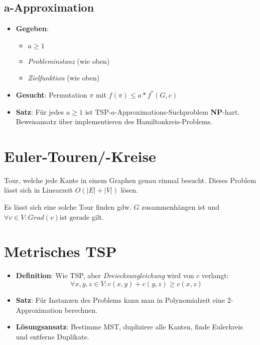\subsection{a-Approximation}

\begin{itemize}
  \item \textbf{Gegeben}:
  \begin{itemize}
    \item $ a \geq 1 $
    \item \emph{Probleminstanz} (wie oben)
    \item \emph{Zielfunktion} (wie oben)
  \end{itemize}
  \item \textbf{Gesucht}: Permutation $ \pi $ mit $ f(\pi) \leq a*f^*(G,c) $
  \item \textbf{Satz}: Für jedes $ a \geq 1 $ ist TSP-$ a $-Approximations-Suchproblem \textbf{NP}-hart. Beweisansatz über implementieren des Hamiltonkreis-Problems.
\end{itemize}


\section{Euler-Touren/-Kreise}
Tour, welche jede Kante in einem Graphen genau einmal besucht. Dieses Problem lässt sich in Linearzeit $O(|E|+|V|)$ lösen. 

Es lässt sich eine solche Tour finden gdw. $G$ zusammenhängen ist und $\forall v\in V: Grad(v) \text{ist gerade}$ gilt.

\section{Metrisches TSP}

\begin{itemize}
  \item \textbf{Definition}: Wie TSP, aber \emph{Dreiecksungleichung} wird von $ c $ verlangt:
  \begin{equation*}
    \forall x, y, z \in V : c(x,y) + c(y,z) \geq c(x,z)
  \end{equation*}
  \item \textbf{Satz}: Für Instanzen des Problems kann man in Polynomialzeit eine $ 2 $-Approximation berechnen. 
  \item \textbf{Lösungsansatz}: Bestimme MST, dupliziere alle Kanten, finde Eulerkreis und entferne Duplikate.
\end{itemize}

